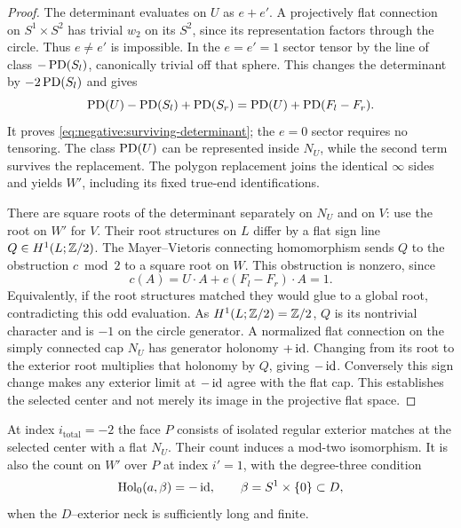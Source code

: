 \begin{proof}
The determinant evaluates on $U$ as $e+e'$.  A projectively flat
connection on $S^1\times S^2$ has trivial $w_2$ on its $S^2$, since
its representation factors through the circle.  Thus $e\ne e'$
is impossible.  In the $e=e'=1$ sector tensor by the line of class
$-\operatorname{PD}(S_l)$, canonically trivial off that sphere.  This changes the
determinant by $-2\operatorname{PD}(S_l)$ and gives
\[
 \operatorname{PD}(U)-\operatorname{PD}(S_l)+\operatorname{PD}(S_r)
   =\operatorname{PD}(U)+\operatorname{PD}(F_l-F_r).
\]
It proves \eqref{eq:negative:surviving-determinant}; the $e=0$ sector
requires no tensoring.  The class $\operatorname{PD}(U)$ can be represented inside
$N_U$, while the second term survives the replacement.  The polygon
replacement joins the identical $\infty$ sides and yields $W'$,
including its fixed true-end identifications.

There are square roots of the determinant separately on $N_U$ and on
$V$: use the root on $W'$ for $V$.  Their root structures on $L$
differ by a flat sign line $Q\in H^1(L;\mathbb Z/2)$.  The Mayer--Vietoris
connecting homomorphism sends $Q$ to the obstruction $c\bmod2$ to
a square root on $W$.  This obstruction is nonzero, since
\[
 c(A)=U\cdot A+e(F_l-F_r)\cdot A=1.
\]
Equivalently, if the root structures matched they would glue to a
global root, contradicting this odd evaluation.  As
$H^1(L;\mathbb Z/2)=\mathbb Z/2$, $Q$ is its nontrivial character and is $-1$
on the circle generator.  A normalized flat connection on the simply
connected cap $N_U$ has generator holonomy $+\operatorname{id}$.  Changing from
its root to the exterior root multiplies that holonomy by $Q$, giving
$-\operatorname{id}$.  Conversely this sign change makes any exterior limit at
$-\operatorname{id}$ agree with the flat cap.  This establishes the selected center
and not merely its image in the projective flat space.
\end{proof}

\begin{lemma}\label{lem:negative:pentagon}
At index $i_{\mathrm{total}}=-2$ the face $P$ consists of isolated
regular exterior matches at the selected center with a flat $N_U$.
Their count induces a mod-two isomorphism.  It is also the count on
$W'$ over $P$ at index $i'=1$, with the degree-three condition
\begin{equation}\label{eq:negative:beta-cut}
 \operatorname{Hol}_0(a,\beta)=-\operatorname{id},
 \qquad \beta=S^1\times\{0\}\subset D,
\end{equation}
when the $D$--exterior neck is sufficiently long and finite.
\end{lemma}

